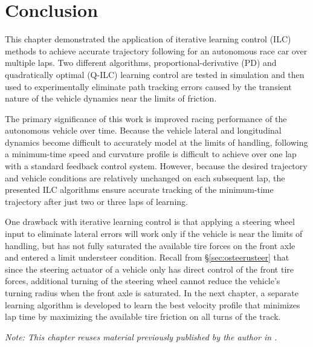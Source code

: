 \section{Conclusion}

This chapter demonstrated the application of iterative learning control (ILC) methods to achieve accurate trajectory
following for an autonomous race car over multiple laps. Two different algorithms, proportional-derivative (PD) and 
quadratically optimal (Q-ILC) learning control are tested in simulation and then used to experimentally 
eliminate path tracking errors caused by the transient nature of the vehicle dynamics near the limits of friction. 

The primary significance of this work is improved racing performance of the autonomous vehicle over time. Because the vehicle lateral
and longitudinal dynamics become difficult to accurately model at the limits of handling, following a minimum-time speed and curvature
profile is difficult to achieve over one lap with a standard feedback control system. However, because the desired trajectory and vehicle
conditions are relatively unchanged on each subsequent lap, the presented ILC algorithms ensure accurate tracking of the minimum-time trajectory 
after just two or three laps of learning. 

One drawback with  iterative learning control is that applying a steering wheel input to eliminate
lateral errors will work only if the vehicle is near the limits of handling, but has not fully saturated the available tire forces on the front axle and entered a limit understeer condition.
Recall from \S \ref{sec:osteerusteer} that since the steering actuator of a vehicle only has direct control of the front tire forces, 
 additional turning of the steering wheel cannot reduce the vehicle's turning radius when the front axle is saturated.
In the next chapter, a separate learning algorithm is developed to learn the best velocity profile that minimizes lap time by
maximizing the available tire friction on all turns of the track.

\textit{Note: This chapter reuses material previously published by the author in \cite{kapaniaacc}.}





                                  


 